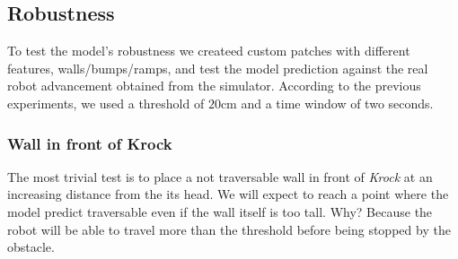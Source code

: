 \subsection{Robustness}
To test the model's robustness we createed custom patches with different features, walls/bumps/ramps, and test the model prediction against the real robot advancement obtained from the simulator. According to the previous experiments, we used a threshold of $20$cm and a time window of two seconds. 
\subsubsection{Wall in front of Krock}
The most trivial test is to place a not traversable wall in front of \emph{Krock} at an increasing distance from the its head. We will expect to reach a point where the model predict traversable even if the wall itself is too tall. Why? Because the robot will be able to travel more than the threshold before being stopped by the obstacle.

